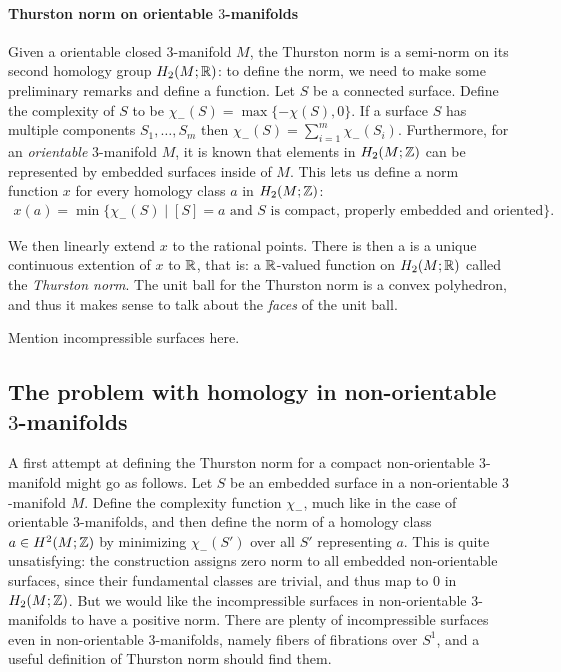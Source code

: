 \paragraph{Thurston norm on orientable $3$-manifolds}
Given a orientable closed $3$-manifold $M$, the Thurston norm is a semi-norm on its second
homology group $H_2(M; \mathbb{R})$: to define the norm, we need to make some preliminary remarks and
define a function.  Let $S$ be a connected surface. Define the complexity of $S$ to be
$\chi_-(S) = \max\{-\chi(S),0\}$. If a surface $S$ has multiple components $S_1,\ldots,S_m$
then $\chi_-(S)=\displaystyle\sum_{i=1}^m\chi_-(S_i)$.  Furthermore, for an \emph{orientable}
3-manifold $M$, it is known that elements in $H_2(M ; \mathbb{Z})$ can be represented by embedded
surfaces inside of $M$. This lets us define a norm function $x$ for every homology class $a$
in $H_2(M; \mathbb{Z})$:
\begin{align*}
  x(a) = \min\{\chi_-(S) \mid [S] = a \text{ and $S$ is compact, properly embedded and oriented}\}.
\end{align*}

We then linearly extend $x$ to the rational points.  There is then a is a unique continuous extention of $x$ to $\mathbb{R}$, that is: a $\mathbb{R}$-valued function on $H_2(M; \mathbb{R})$ called the {\it Thurston norm}. The unit ball for the Thurston norm is a convex polyhedron, and thus it makes
sense to talk about the \emph{faces} of the unit ball.

{\color{red} Mention incompressible surfaces here.}

\subsection{The problem with homology in non-orientable $3$-manifolds}
\label{sec:probl-with-homol}

A first attempt at defining the Thurston norm for a compact non-orientable $3$-manifold might
go as follows.  Let $S$ be an embedded surface in a non-orientable $3$-manifold $M$.  Define
the complexity function $\chi_-$, much like in the case of orientable $3$-manifolds, and then
define the norm of a homology class $a \in H^2(M; \mathbb{Z})$ by minimizing $\chi_-(S')$ over all
$S'$ representing $a$. This is quite unsatisfying: the construction assigns
zero norm to all embedded non-orientable surfaces, since their fundamental classes are
trivial, and thus map to $0$ in $H_2(M; \mathbb{Z})$. But we would like the incompressible surfaces
in non-orientable $3$-manifolds to have a positive norm. There are plenty of incompressible
surfaces even in non-orientable $3$-manifolds, namely fibers of fibrations over $S^1$, and a
useful definition of Thurston norm should find them.

